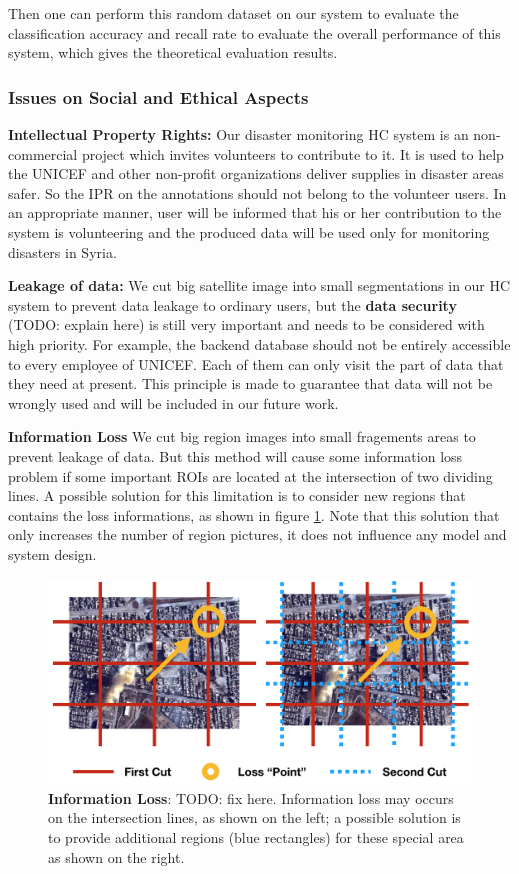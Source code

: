 Then one can perform this random dataset on our system to evaluate the classification accuracy and recall rate to
evaluate the overall performance of this system, which gives the theoretical evaluation results.

\subsubsection{Issues on Social and Ethical Aspects}
\label{chapter:ethical}

\textbf{Intellectual Property Rights:} 
Our disaster monitoring HC system is an non-commercial project which invites volunteers to contribute to it. 
It is used to help the UNICEF and other non-profit organizations deliver supplies in disaster areas safer. 
So the IPR on the annotations should not belong to the volunteer users. In an appropriate manner, user will be informed that 
his or her contribution to the system is volunteering and the produced data will be used only for 
monitoring disasters in Syria.

\textbf{Leakage of data:} 
We cut big satellite image into small segmentations in our HC system to prevent data leakage to ordinary users, 
but the \textbf{data security} (TODO: explain here) is still very important and needs to be considered with high priority. For example, 
the backend database should not be entirely accessible to every employee of UNICEF. 
Each of them can only visit the part of data that they need at present. This principle is made to guarantee 
that data will not be wrongly used and will be included in our future work.

\textbf{Information Loss}
We cut big region images into small fragements areas to prevent leakage of data. 
But this method will cause some information loss problem if some important ROIs are 
located at the intersection of two dividing lines.
A possible solution for this limitation is to consider new regions that contains the loss
informations, as shown in figure \ref{fig:information_loss}. Note that this solution that
only increases the number of region pictures, it does not influence any model and system design.

\begin{figure}[htp]
\centering
\includegraphics[width=0.7\columnwidth]{figures/information_loss3}
\caption{\textbf{Information Loss}: TODO: fix here. Information loss may occurs on the intersection lines, as shown on the left; a possible solution
is to provide additional regions (blue rectangles) for these special area as shown on the right.}
\label{fig:information_loss}
\end{figure}

